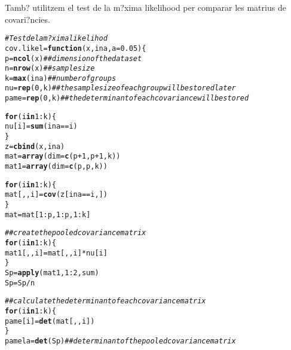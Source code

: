 \documentclass[a4paper,titlepage,12pt]{article}\usepackage[]{graphicx}\usepackage[]{color}
\makeatletter
\newcommand{\hlnum}[1]{\textcolor[rgb]{0.686,0.059,0.569}{#1}}%
\newcommand{\hlcom}[1]{\textcolor[rgb]{0.678,0.584,0.686}{\textit{#1}}}%
\newcommand{\hlopt}[1]{\textcolor[rgb]{0,0,0}{#1}}%
\newcommand{\hlstd}[1]{\textcolor[rgb]{0.345,0.345,0.345}{#1}}%
\newcommand{\hlkwa}[1]{\textcolor[rgb]{0.161,0.373,0.58}{\textbf{#1}}}%
\newcommand{\hlkwb}[1]{\textcolor[rgb]{0.69,0.353,0.396}{#1}}%
\newcommand{\hlkwc}[1]{\textcolor[rgb]{0.333,0.667,0.333}{#1}}%
\newcommand{\hlkwd}[1]{\textcolor[rgb]{0.737,0.353,0.396}{\textbf{#1}}}%
\newenvironment{kframe}{%
 \def\at@end@of@kframe{}%
 \ifinner\ifhmode%
  \def\at@end@of@kframe{\end{minipage}}%
  \begin{minipage}{\columnwidth}%
 \fi\fi%
 \def\FrameCommand##1{\hskip\@totalleftmargin \hskip-\fboxsep
 \colorbox{shadecolor}{##1}\hskip-\fboxsep
     \hskip-\linewidth \hskip-\@totalleftmargin \hskip\columnwidth}%
 \MakeFramed {\advance\hsize-\width
   \@totalleftmargin\z@ \linewidth\hsize
   \@setminipage}}%
 {\par\unskip\endMakeFramed%
 \at@end@of@kframe}
\newenvironment{knitrout}{}{} %
\makeatother
\begin{document}
Tamb? utilitzem el test de la m?xima likelihood per comparar les matrius de covari?ncies.
\begin{knitrout}
\color{fgcolor}\begin{kframe}
\begin{alltt}
\hlcom{# Test de la m?xima likelihod}
\hlstd{cov.likel} \hlkwb{=} \hlkwa{function}\hlstd{(}\hlkwc{x}\hlstd{,} \hlkwc{ina}\hlstd{,} \hlkwc{a} \hlstd{=} \hlnum{0.05}\hlstd{) \{}
    \hlstd{p} \hlkwb{=} \hlkwd{ncol}\hlstd{(x)}  \hlcom{## dimension of the data set}
    \hlstd{n} \hlkwb{=} \hlkwd{nrow}\hlstd{(x)}  \hlcom{## sample size}
    \hlstd{k} \hlkwb{=} \hlkwd{max}\hlstd{(ina)}  \hlcom{## number of groups}
    \hlstd{nu} \hlkwb{=} \hlkwd{rep}\hlstd{(}\hlnum{0}\hlstd{, k)}  \hlcom{## the sample size of each group will be stored later}
    \hlstd{pame} \hlkwb{=} \hlkwd{rep}\hlstd{(}\hlnum{0}\hlstd{, k)}  \hlcom{## the determinant of each covariance will be stored}

    \hlkwa{for} \hlstd{(i} \hlkwa{in} \hlnum{1}\hlopt{:}\hlstd{k) \{}
        \hlstd{nu[i]} \hlkwb{=} \hlkwd{sum}\hlstd{(ina} \hlopt{==} \hlstd{i)}
    \hlstd{\}}
    \hlstd{z} \hlkwb{=} \hlkwd{cbind}\hlstd{(x, ina)}
    \hlstd{mat} \hlkwb{=} \hlkwd{array}\hlstd{(}\hlkwc{dim} \hlstd{=} \hlkwd{c}\hlstd{(p} \hlopt{+} \hlnum{1}\hlstd{, p} \hlopt{+} \hlnum{1}\hlstd{, k))}
    \hlstd{mat1} \hlkwb{=} \hlkwd{array}\hlstd{(}\hlkwc{dim} \hlstd{=} \hlkwd{c}\hlstd{(p, p, k))}

    \hlkwa{for} \hlstd{(i} \hlkwa{in} \hlnum{1}\hlopt{:}\hlstd{k) \{}
        \hlstd{mat[, , i]} \hlkwb{=} \hlkwd{cov}\hlstd{(z[ina} \hlopt{==} \hlstd{i, ])}
    \hlstd{\}}
    \hlstd{mat} \hlkwb{=} \hlstd{mat[}\hlnum{1}\hlopt{:}\hlstd{p,} \hlnum{1}\hlopt{:}\hlstd{p,} \hlnum{1}\hlopt{:}\hlstd{k]}

    \hlcom{## create the pooled covariance matrix}
    \hlkwa{for} \hlstd{(i} \hlkwa{in} \hlnum{1}\hlopt{:}\hlstd{k) \{}
        \hlstd{mat1[, , i]} \hlkwb{=} \hlstd{mat[, , i]} \hlopt{*} \hlstd{nu[i]}
    \hlstd{\}}
    \hlstd{Sp} \hlkwb{=} \hlkwd{apply}\hlstd{(mat1,} \hlnum{1}\hlopt{:}\hlnum{2}\hlstd{, sum)}
    \hlstd{Sp} \hlkwb{=} \hlstd{Sp}\hlopt{/}\hlstd{n}

    \hlcom{## calculate the determinant of each covariance matrix}
    \hlkwa{for} \hlstd{(i} \hlkwa{in} \hlnum{1}\hlopt{:}\hlstd{k) \{}
        \hlstd{pame[i]} \hlkwb{=} \hlkwd{det}\hlstd{(mat[, , i])}
    \hlstd{\}}
    \hlstd{pamela} \hlkwb{=} \hlkwd{det}\hlstd{(Sp)}  \hlcom{## determinant of the pooled covariance matrix}


\end{alltt}
\end{kframe}
\end{knitrout}
\end{document}

